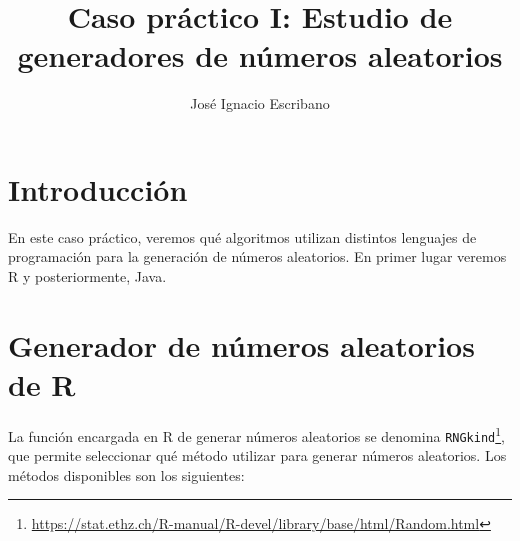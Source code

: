 \documentclass[12pt,a4paper,twoside,openright,titlepage,final]{article}
\author{José Ignacio Escribano}
\title{Caso práctico I: Estudio de generadores de números aleatorios}
\begin{document}
\setcounter{page}{1}


\tableofcontents
\thispagestyle{empty}
\newpage


\setcounter{page}{1}

\section{Introducción}

En este caso práctico, veremos qué algoritmos utilizan distintos lenguajes de programación para la generación de números aleatorios. En primer lugar veremos R y posteriormente, Java.

\section{Generador de números aleatorios de R}

La función encargada en R de generar números aleatorios se denomina \texttt{RNGkind}\footnote{\url{https://stat.ethz.ch/R-manual/R-devel/library/base/html/Random.html}}, que permite seleccionar qué método utilizar para generar números aleatorios. Los métodos disponibles son los siguientes:
\end{document}
